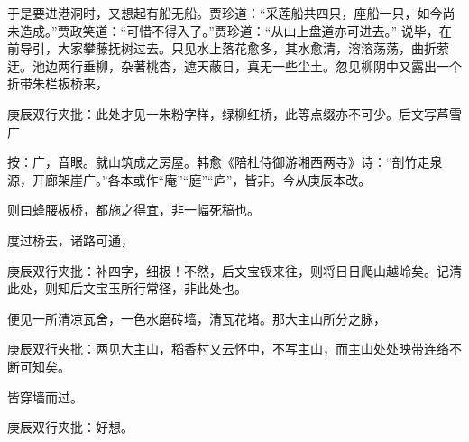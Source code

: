 \begin{parag}

    于是要进港洞时，又想起有船无船。贾珍道：“采莲船共四只，座船一只，如今尚未造成。”贾政笑道：“可惜不得入了。”贾珍道：“从山上盘道亦可进去。” 说毕，在前导引，大家攀藤抚树过去。只见水上落花愈多，其水愈清，溶溶荡荡，曲折萦迂。池边两行垂柳，杂著桃杏，遮天蔽日，真无一些尘土。忽见柳阴中又露出一个折带朱栏板桥来，\begin{note}庚辰双行夹批：此处才见一朱粉字样，绿柳红桥，此等点缀亦不可少。后文写芦雪广\end{note}\begin{subnote}按：广，音眼。就山筑成之房屋。韩愈《陪杜侍御游湘西两寺》诗：“剖竹走泉源，开廊架崖广。”各本或作“庵”“庭”“庐”，皆非。今从庚辰本改。\end{subnote}\begin{note}则曰蜂腰板桥，都施之得宜，非一幅死稿也。\end{note}度过桥去，诸路可通，\begin{note}庚辰双行夹批：补四字，细极！不然，后文宝钗来往，则将日日爬山越岭矣。记清此处，则知后文宝玉所行常径，非此处也。\end{note}便见一所清凉瓦舍，一色水磨砖墙，清瓦花堵。那大主山所分之脉，\begin{note}庚辰双行夹批：两见大主山，稻香村又云怀中，不写主山，而主山处处映带连络不断可知矣。\end{note}皆穿墙而过。\begin{note}庚辰双行夹批：好想。\end{note}
\end{parag}


